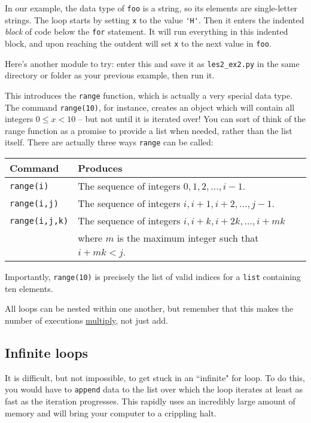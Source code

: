 \documentclass[m3380-lec-main.tex]{subfiles}
\begin{document}
In our example, the data type of \verb|foo| is a string, so its elements are single-letter strings. The loop starts by setting \verb|x| to the value \verb|'H'|. Then it enters the indented \emph{block} of code below the \verb|for| statement. It will run everything in this indented block, and upon reaching the outdent will set \verb|x| to the next value in \verb|foo|.

Here's another module to try: enter this and save it as \verb|les2_ex2.py| in the same directory or folder as your previous example, then run it.

\noindent

This introduces the \verb|range| function, which is actually a very special data type. The command \verb|range(10)|, for instance, creates an object which will contain all integers $0\leq x<10$ -- but not until it is iterated over! You can sort of think of the range function as a promise to provide a list when needed, rather than the list itself. There are actually three ways \verb|range| can be called:
\begin{center}
\begin{tabular}{l|l}
\textbf{Command} & \textbf{Produces} \\\hline
\verb|range(i)| & The sequence of integers $0,1,2,\ldots,i-1$. \\
\verb|range(i,j)| & The sequence of integers $i, i+1, i+2,\ldots, j-1$.\\
\verb|range(i,j,k)| & The sequence of integers $i, i+k, i+2k,\ldots,i+mk$ \\
	& where $m$ is the maximum integer such that $i+mk<j$.
\end{tabular}
\end{center}
Importantly, \verb|range(10)| is precisely the list of valid indices for a \verb|list| containing ten elements.

All loops can be nested within one another, but remember that this makes the number of executions \underline{multiply}, not just add.

\subsection{Infinite loops} It is difficult, but not impossible, to get stuck in an ``infinite" for loop. To do this, you would have to \verb|append| data to the list over which the loop iterates at least as fast as the iteration progresses. This rapidly uses an incredibly large amount of memory and will bring your computer to a crippling halt.
\end{document}
